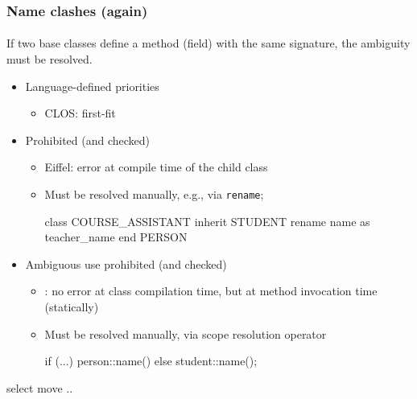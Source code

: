 \documentclass{beamer}
\begin{document}

\begin{frame}[fragile]
\frametitle{Name clashes (again)}
\framesubtitle{}
If two base classes define a method (field) with the same signature,
the ambiguity must be resolved. 

\begin{itemize}
\item Language-defined priorities
\begin{itemize}
\item CLOS: first-fit
\end{itemize}
\item Prohibited (and checked)
\begin{itemize}
\item Eiffel: error at compile time of the child class
\item Must be resolved manually, e.g., via \texttt{rename}; %
\begin{eiffel}
class COURSE_ASSISTANT
inherit
      STUDENT
          rename
              name as teacher_name
          end
      PERSON
\end{eiffel}
\end{itemize}
\item Ambiguous use prohibited (and checked)
\begin{itemize}
\item \Cpp: no error at class compilation time, but at method invocation
time (statically)
\item Must be resolved manually,  via scope resolution operator
\begin{cplus3}
if (...) person::name() else student::name(); 
\end{cplus3} 
\end{itemize}
\end{itemize}
       select 
          move ..

\end{frame}
\end{document}
